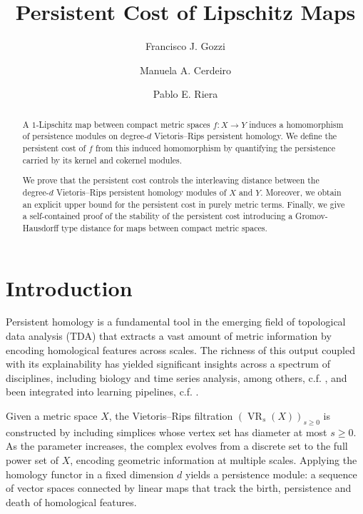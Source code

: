 \documentclass[11pt]{article}
\title{Persistent Cost of Lipschitz Maps}
\author{
  Francisco J. Gozzi\footnotemark[1] \and
  Manuela A. Cerdeiro\footnotemark[2] \footnotemark[3] \and
  Pablo E. Riera\footnotemark[2] \footnotemark[3]
}
\DeclareMathOperator{\VR}{VR}
\begin{document}
\maketitle

\begin{abstract}
A $1$-Lipschitz map between compact metric spaces $f\colon X\to Y$ induces a homomorphism of persistence modules on degree-$d$ Vietoris--Rips persistent homology. We define the persistent cost of $f$ from this induced homomorphism by quantifying the persistence carried by its kernel and cokernel modules.

We prove that the persistent cost controls the interleaving distance between the degree-$d$ Vietoris--Rips persistent homology modules of $X$ and $Y$. Moreover, we obtain an explicit upper bound for the persistent cost in purely metric terms. Finally, we give a self-contained proof of the stability of the persistent cost introducing a Gromov-Hausdorff type distance for maps between compact metric spaces.
\end{abstract}





\section*{Introduction}

Persistent homology is a fundamental tool in the emerging field of topological data analysis (TDA) that extracts a vast amount of metric information by encoding homological features across scales.
The richness of this output coupled with its explainability has yielded significant insights across a spectrum of disciplines, including biology and time series analysis, among others, c.f. \cite{otter2017roadmap, perea2015sliding, gardner2022toroidal}, and been integrated into learning pipelines, c.f. \cite{hensel2021survey, hofer2017deep}.


Given a metric space \( X \), the Vietoris--Rips filtration \( (\VR_s(X))_{s \geq 0} \) is constructed by including simplices whose vertex set has diameter at most \( s \geq 0 \). As the parameter increases, the complex evolves from a discrete set to the full power set of \( X \), encoding geometric information at multiple scales. Applying the homology functor in a fixed dimension \( d \) yields a persistence module: a sequence of vector spaces connected by linear maps that track the birth, persistence and death of homological features. 
\end{document}
